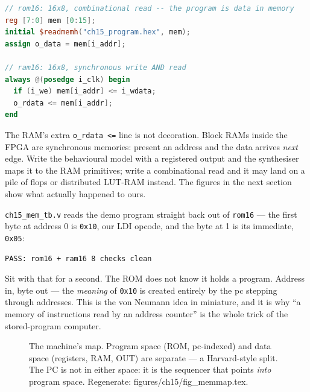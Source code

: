 \begin{lstlisting}[language=Verilog, caption={\ttfamily code/ch15\_rom.v
and \ttfamily ch15\_ram.v --- the two personalities side by side. The
ROM reads combinationally (fetch wants the instruction now); the RAM
registers its read output, the pattern that maps onto BRAM.},
label={lst:romram}]
// rom16: 16x8, combinational read -- the program is data in memory
reg [7:0] mem [0:15];
initial $readmemh("ch15_program.hex", mem);
assign o_data = mem[i_addr];

// ram16: 16x8, synchronous write AND read
always @(posedge i_clk) begin
  if (i_we) mem[i_addr] <= i_wdata;
  o_rdata <= mem[i_addr];
end
\end{lstlisting}

The RAM's extra \texttt{o\_rdata <=} line is not decoration. Block
RAMs inside the FPGA are synchronous memories: present an address and
the data arrives \emph{next} edge. Write the behavioural model with a
registered output and the synthesiser maps it to the RAM primitives;
write a combinational read and it may land on a pile of flops or
distributed LUT-RAM instead. The figures in the next section show what
actually happened to ours.

\begin{example}
\texttt{ch15\_mem\_tb.v} reads the demo program straight back out of
\texttt{rom16} --- the first byte at address 0 is \texttt{0x10},
our LDI opcode, and the byte at 1 is its immediate, \texttt{0x05}:

\begin{lstlisting}[caption={Real run of \ttfamily ch15\_mem\_tb.v ---
five ROM reads plus three RAM read/write/latency checks.}]
PASS: rom16 + ram16 8 checks clean
\end{lstlisting}

Sit with that for a second. The ROM does not know it holds a program.
Address in, byte out --- the \emph{meaning} of \texttt{0x10} is
created entirely by the pc stepping through addresses. This is the
von Neumann idea in miniature, and it is why ``a memory of
instructions read by an address counter'' is the whole trick of the
stored-program computer.
\end{example}

\begin{figure}[htbp]
\centering

\caption{The machine's map. Program space (ROM, pc-indexed) and data
space (registers, RAM, OUT) are separate --- a Harvard-style split.
The PC is not in either space: it is the sequencer that points
\emph{into} program space. Regenerate: \ttfamily
figures/ch15/fig\_memmap.tex.}
\label{fig:memmap15}
\end{figure}


